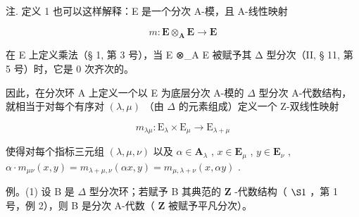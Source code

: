 注. 定义 1 也可以这样解释：E 是一个分次 A-模，且 A-线性映射

\[
m \colon \mathbf {E} \otimes_ {\mathbf {A}} \mathbf {E} \rightarrow \mathbf {E}
\]

在 E 上定义乘法（§ 1, 第 3 号），当 E ⊗\_A E 被赋予其 Δ 型分次（II, § 11, 第 5 号）时，它是 0 次齐次的。

因此，在分次环 A 上定义一个以 E 为底层分次 A-模的 \(\Delta\) 型分次 A-代数结构，就相当于对每个有序对 \((\lambda, \mu)\) （由 \(\Delta\) 的元素组成）定义一个 Z-双线性映射

\[
m _ {\lambda \mu}: \mathrm{E} _ {\lambda} \times \mathrm{E} _ {\mu} \rightarrow \mathrm{E} _ {\lambda + \mu}
\]

使得对每个指标三元组 \((\lambda, \mu, \nu)\) 以及 \(\alpha \in \mathbf{A}_{\lambda}\) , \(x \in \mathbf{E}_{\mu}\) , \(y \in \mathbf{E}_{\nu}\) , \(\alpha \cdot m_{\mu\nu}(x, y) = m_{\lambda + \mu, \nu}(\alpha x, y) = m_{\mu, \lambda + \nu}(x, \alpha y)\) .

例。(1) 设 B 是 \(\Delta\) 型分次环；若赋予 B 其典范的 \(\mathbf{Z}\) -代数结构（ \(\S 1\) ，第 1 号，例 2），则 B 是分次 A-代数（ \(\mathbf{Z}\) 被赋予平凡分次）。


